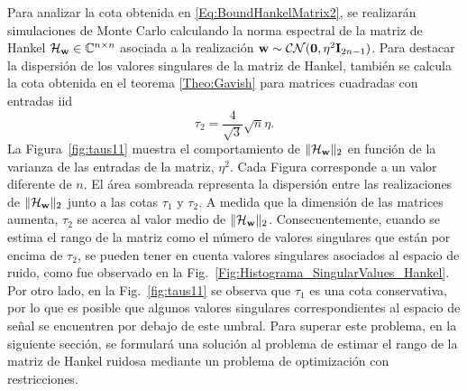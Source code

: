 	Para analizar la cota obtenida en \eqref{Eq:BoundHankelMatrix2}, se realizarán simulaciones de Monte Carlo calculando la norma espectral de la matriz de Hankel $\mathcal{H}_{\mathbf{w}}\in\mathbb{C}^{n\times n}$ asociada a la realización $\mathbf{w}\sim\mathcal{CN}(\mathbf{0},\eta^2\mathbf{I}_{2n-1})$. Para destacar la dispersión de los valores singulares de la matriz de Hankel, también se calcula la cota obtenida en el teorema \ref{Theo:Gavish} para matrices cuadradas con entradas iid
	\begin{equation}
		\tau_2 = \frac{4}{\sqrt{3}}\sqrt{n}\eta.
		\label{eq:gavish}
	\end{equation}
	La Figura~\ref{fig:taus11} muestra el comportamiento de $\|\mathcal{H}_{\mathbf{w}}\|_2$ en función de la varianza de las entradas de la matriz, $\eta^2$. Cada Figura corresponde a un valor diferente de $n$. El área sombreada representa la dispersión entre las realizaciones de $\|\mathcal{H}_{\mathbf{w}}\|_2$ junto a las cotas $\tau_1$ y $\tau_2$. A medida que la dimensión de las matrices aumenta, $\tau_2$ se acerca al valor medio de $\|\mathcal{H}_{\mathbf{w}}\|_2$. Consecuentemente, cuando se estima el rango de la matriz como el número de valores singulares que están por encima de $\tau_2$, se pueden tener en cuenta valores singulares asociados al espacio de ruido,  como fue observado en  la Fig.~\ref{Fig:Histograma_SingularValues_Hankel}. Por otro lado, en la Fig.~\ref{fig:taus11} se observa que $\tau_1$ es una cota conservativa, por lo que es posible que algunos valores singulares correspondientes al espacio de señal se encuentren por debajo de este umbral. Para superar este problema, en la siguiente sección, se formulará una solución al problema de estimar el rango de la matriz de Hankel ruidosa mediante un problema de optimización con restricciones.
	
